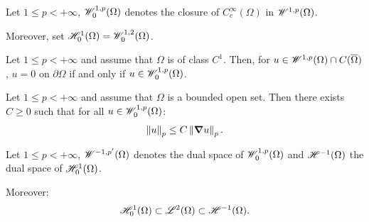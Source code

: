 \begin{definition}
    Let $1 \leq p < +\infty$, $\mathscr{W}^{1, p}_0(\Omega)$ denotes the closure of $C_c^{\infty}(\Omega)$ in $\mathscr{W}^{1, p}(\Omega)$.

    Moreover, set $\mathscr{H}^{1}_0(\Omega) = \mathscr{W}^{1, 2}_0(\Omega)$.
\end{definition}

\begin{theorem}
    Let $1 \leq p < +\infty$ and assume that $\Omega$ is of class $C^1$. Then, for $u \in \mathscr{W}^{1, p}(\Omega) \cap C(\overline{\Omega})$, $u = 0$ on $\partial \Omega$ if and only if $u \in \mathscr{W}^{1, p}_0(\Omega)$.
\end{theorem}

\begin{theorem}
    Let $1 \leq p < +\infty$ and assume that $\Omega$ is a bounded open set. Then there exists $C \geq 0$ such that for all $u \in \mathscr{W}^{1, p}_0(\Omega)$:
    \begin{align}
        \left\lVert u \right\rVert_p \leq C \left\lVert \bm{\nabla} u \right\rVert_p.
    \end{align}
\end{theorem}

\begin{definition}
    Let $1 \leq p < +\infty$, $\mathscr{W}^{-1, p^{\prime}}(\Omega)$ denotes the dual space of $\mathscr{W}^{1, p}_0(\Omega)$ and $\mathscr{H}^{-1}(\Omega)$ the dual space of $\mathscr{H}^{1}_0(\Omega)$.

    Moreover:
    \begin{align}
        \mathscr{H}^{1}_0(\Omega) \subset \mathscr{L}^{2}(\Omega) \subset \mathscr{H}^{-1}(\Omega).
    \end{align}
\end{definition}